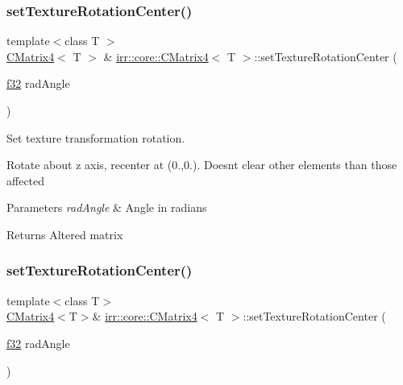 \subsubsection{\texorpdfstring{set\+Texture\+Rotation\+Center()}{setTextureRotationCenter()}\hspace{0.1cm}{\footnotesize\ttfamily [1/2]}}
{\footnotesize\ttfamily template$<$class T $>$ \\
\hyperlink{classirr_1_1core_1_1CMatrix4}{C\+Matrix4}$<$ T $>$ \& \hyperlink{classirr_1_1core_1_1CMatrix4}{irr\+::core\+::\+C\+Matrix4}$<$ T $>$\+::set\+Texture\+Rotation\+Center (\begin{DoxyParamCaption}\item[{\hyperlink{namespaceirr_a0277be98d67dc26ff93b1a6a1d086b07}{f32}}]{rad\+Angle }\end{DoxyParamCaption})\hspace{0.3cm}{\ttfamily [inline]}}



Set texture transformation rotation. 

Rotate about z axis, recenter at (0.,0.). Doesn\textquotesingle{}t clear other elements than those affected 
\begin{DoxyParams}{Parameters}
{\em rad\+Angle} & Angle in radians \\
\hline
\end{DoxyParams}
\begin{DoxyReturn}{Returns}
Altered matrix 
\end{DoxyReturn}
\mbox{\label{classirr_1_1core_1_1CMatrix4_abd4be8e5517bae85d64647ee5ddf2c42}} 
\subsubsection{\texorpdfstring{set\+Texture\+Rotation\+Center()}{setTextureRotationCenter()}\hspace{0.1cm}{\footnotesize\ttfamily [2/2]}}
{\footnotesize\ttfamily template$<$class T$>$ \\
\hyperlink{classirr_1_1core_1_1CMatrix4}{C\+Matrix4}$<$T$>$\& \hyperlink{classirr_1_1core_1_1CMatrix4}{irr\+::core\+::\+C\+Matrix4}$<$ T $>$\+::set\+Texture\+Rotation\+Center (\begin{DoxyParamCaption}\item[{\hyperlink{namespaceirr_a0277be98d67dc26ff93b1a6a1d086b07}{f32}}]{rad\+Angle }\end{DoxyParamCaption})}



